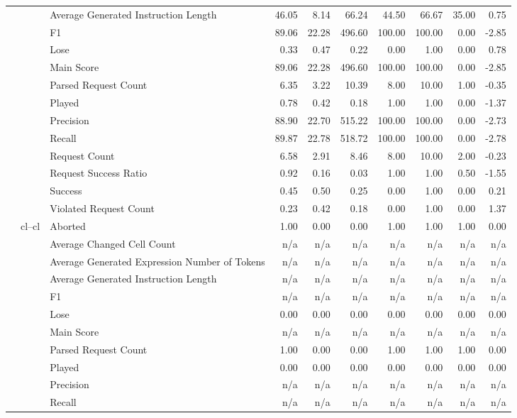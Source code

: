 \begin{tabular}{lllrrrrrrr}
 &  & Average Generated Instruction Length & 46.05 & 8.14 & 66.24 & 44.50 & 66.67 & 35.00 & 0.75 \\
 &  & F1 & 89.06 & 22.28 & 496.60 & 100.00 & 100.00 & 0.00 & -2.85 \\
 &  & Lose & 0.33 & 0.47 & 0.22 & 0.00 & 1.00 & 0.00 & 0.78 \\
 &  & Main Score & 89.06 & 22.28 & 496.60 & 100.00 & 100.00 & 0.00 & -2.85 \\
 &  & Parsed Request Count & 6.35 & 3.22 & 10.39 & 8.00 & 10.00 & 1.00 & -0.35 \\
 &  & Played & 0.78 & 0.42 & 0.18 & 1.00 & 1.00 & 0.00 & -1.37 \\
 &  & Precision & 88.90 & 22.70 & 515.22 & 100.00 & 100.00 & 0.00 & -2.73 \\
 &  & Recall & 89.87 & 22.78 & 518.72 & 100.00 & 100.00 & 0.00 & -2.78 \\
 &  & Request Count & 6.58 & 2.91 & 8.46 & 8.00 & 10.00 & 2.00 & -0.23 \\
 &  & Request Success Ratio & 0.92 & 0.16 & 0.03 & 1.00 & 1.00 & 0.50 & -1.55 \\
 &  & Success & 0.45 & 0.50 & 0.25 & 0.00 & 1.00 & 0.00 & 0.21 \\
 &  & Violated Request Count & 0.23 & 0.42 & 0.18 & 0.00 & 1.00 & 0.00 & 1.37 \\
\cline{2-10}
 & \multirow[t]{15}{*}{cl--cl} & Aborted & 1.00 & 0.00 & 0.00 & 1.00 & 1.00 & 1.00 & 0.00 \\
 &  & Average Changed Cell Count & n/a & n/a & n/a & n/a & n/a & n/a & n/a \\
 &  & Average Generated Expression Number of Tokens & n/a & n/a & n/a & n/a & n/a & n/a & n/a \\
 &  & Average Generated Instruction Length & n/a & n/a & n/a & n/a & n/a & n/a & n/a \\
 &  & F1 & n/a & n/a & n/a & n/a & n/a & n/a & n/a \\
 &  & Lose & 0.00 & 0.00 & 0.00 & 0.00 & 0.00 & 0.00 & 0.00 \\
 &  & Main Score & n/a & n/a & n/a & n/a & n/a & n/a & n/a \\
 &  & Parsed Request Count & 1.00 & 0.00 & 0.00 & 1.00 & 1.00 & 1.00 & 0.00 \\
 &  & Played & 0.00 & 0.00 & 0.00 & 0.00 & 0.00 & 0.00 & 0.00 \\
 &  & Precision & n/a & n/a & n/a & n/a & n/a & n/a & n/a \\
 &  & Recall & n/a & n/a & n/a & n/a & n/a & n/a & n/a \\

\end{tabular}
